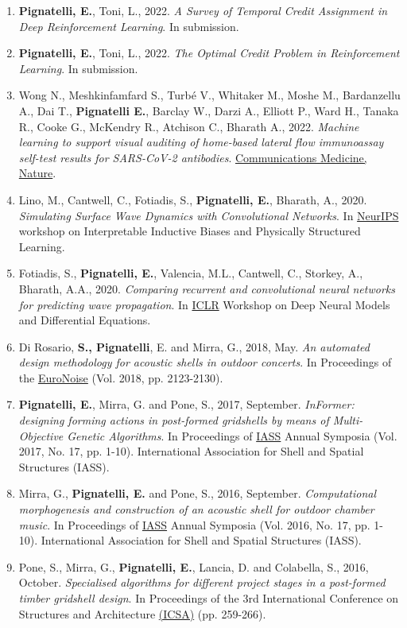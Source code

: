 \begin{enumerate}[leftmargin=0.45cm, itemsep=0em, topsep=0.5em, parsep=0.2em]
    \item \textbf{Pignatelli, E.}, Toni, L., 2022. \textit{A Survey of Temporal Credit Assignment in Deep Reinforcement Learning}. In submission.
    \item \textbf{Pignatelli, E.}, Toni, L., 2022. \textit{The Optimal Credit Problem in Reinforcement Learning}. In submission.
    \item Wong N., Meshkinfamfard S., Turbé V., Whitaker M., Moshe M., Bardanzellu A., Dai T., \textbf{Pignatelli E.}, Barclay W., Darzi A., Elliott P., Ward H., Tanaka R., Cooke G., McKendry R., Atchison C., Bharath A., 2022. \textit{Machine learning to support visual auditing of home-based lateral flow immunoassay self-test results for SARS-CoV-2 antibodies}. \underline{Communications Medicine, Nature}.
    \item Lino, M., Cantwell, C., Fotiadis, S., \textbf{Pignatelli, E.}, Bharath, A., 2020. \textit{Simulating Surface Wave Dynamics with Convolutional Networks}. In \underline{NeurIPS} workshop on Interpretable Inductive Biases and Physically Structured Learning.
    \item Fotiadis, S., \textbf{Pignatelli, E.}, Valencia, M.L., Cantwell, C., Storkey, A., Bharath, A.A., 2020. \textit{Comparing recurrent and convolutional neural networks for predicting wave propagation}. In \underline{ICLR} Workshop on Deep Neural Models and Differential Equations.
    \item Di Rosario, \textbf{S., Pignatelli}, E. and Mirra, G., 2018, May. \textit{An automated design methodology for acoustic shells in outdoor concerts}. In Proceedings of the \underline{EuroNoise} (Vol. 2018, pp. 2123-2130).
    \item \textbf{Pignatelli, E.}, Mirra, G. and Pone, S., 2017, September. \textit{InFormer: designing forming actions in post-formed gridshells by means of Multi-Objective Genetic Algorithms}. In Proceedings of \underline{IASS} Annual Symposia (Vol. 2017, No. 17, pp. 1-10). International Association for Shell and Spatial Structures (IASS).
    \item Mirra, G., \textbf{Pignatelli, E.} and Pone, S., 2016, September. \textit{Computational morphogenesis and construction of an acoustic shell for outdoor chamber music}. In Proceedings of \underline{IASS} Annual Symposia (Vol. 2016, No. 17, pp. 1-10). International Association for Shell and Spatial Structures (IASS).
    \item Pone, S., Mirra, G., \textbf{Pignatelli, E.}, Lancia, D. and Colabella, S., 2016, October. \textit{Specialised algorithms for different project stages in a post-formed timber gridshell design}. In Proceedings of the 3rd International Conference on Structures and Architecture \underline{(ICSA)} (pp. 259-266).

\end{enumerate}
